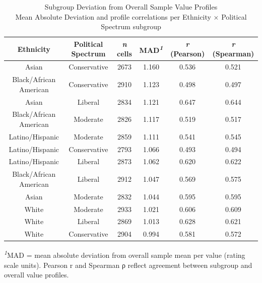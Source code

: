 \begin{table}
\caption*{
{\large Subgroup Deviation from Overall Sample Value Profiles} \\ 
{\small Mean Absolute Deviation and profile correlations per Ethnicity × Political Spectrum subgroup}
} 
\fontsize{9.0pt}{10.8pt}\selectfont
\begin{tabular*}{\linewidth}{@{\extracolsep{\fill}}cccccc}
\toprule
Ethnicity & Political Spectrum & \emph{n} cells & MAD\textsuperscript{\textit{1}} & \emph{r} (Pearson) & \emph{r} (Spearman) \\ 
\midrule\addlinespace[2.5pt]
Asian & Conservative & 2673 & 1.160 & 0.536 & 0.521 \\ 
Black/African American & Conservative & 2910 & 1.123 & 0.498 & 0.497 \\ 
Asian & Liberal & 2834 & 1.121 & 0.647 & 0.644 \\ 
Black/African American & Moderate & 2826 & 1.117 & 0.519 & 0.517 \\ 
Latino/Hispanic & Moderate & 2859 & 1.111 & 0.541 & 0.545 \\ 
Latino/Hispanic & Conservative & 2793 & 1.066 & 0.493 & 0.494 \\ 
Latino/Hispanic & Liberal & 2873 & 1.062 & 0.620 & 0.622 \\ 
Black/African American & Liberal & 2912 & 1.047 & 0.569 & 0.575 \\ 
Asian & Moderate & 2832 & 1.044 & 0.595 & 0.595 \\ 
White & Moderate & 2933 & 1.021 & 0.606 & 0.609 \\ 
White & Liberal & 2869 & 1.013 & 0.628 & 0.621 \\ 
White & Conservative & 2904 & 0.994 & 0.581 & 0.572 \\ 
\bottomrule
\end{tabular*}
\begin{minipage}{\linewidth}
\textsuperscript{\textit{1}}MAD = mean absolute deviation from overall sample mean per value (rating scale units).
                Pearson r and Spearman ρ reflect agreement between subgroup and overall value profiles.\\
\end{minipage}
\end{table}

